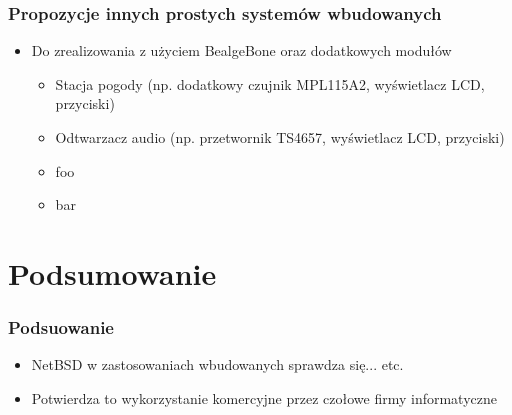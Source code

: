 \documentclass[dvipsnames,table]{beamer}
\begin{document}

\begin{frame}
\frametitle{Propozycje innych prostych systemów wbudowanych}
\begin{itemize}
	\item Do zrealizowania z użyciem BealgeBone oraz dodatkowych modułów
	\begin{itemize}
		\item Stacja pogody (np. dodatkowy czujnik MPL115A2, wyświetlacz LCD, przyciski)
		\item Odtwarzacz audio (np. przetwornik TS4657, wyświetlacz LCD, przyciski)
		\item foo
		\item bar
	\end{itemize}
\end{itemize}
\end{frame}


\section{Podsumowanie}

\begin{frame}
\frametitle{Podsuowanie}
\begin{itemize}
	\item NetBSD w zastosowaniach wbudowanych sprawdza się... etc.
	\item Potwierdza to wykorzystanie komercyjne przez czołowe firmy informatyczne
\end{itemize}
\end{frame}
\end{document}
